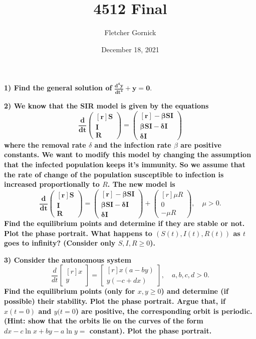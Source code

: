 \documentclass[11pt]{article}
\title{4512 Final}
\author{Fletcher Gornick}
\date{December 18, 2021}
\begin{document}
 \maketitle 
 \textbf{1) Find the general solution of } \(\mathbf{\displaystyle\frac{d^4 y}{dt^4} + y = 0.}\)
 \newpage

 \textbf{2) We know that the SIR model is given by the equations}
 \[\mathbf{\frac{d}{dt} \begin{pmatrix*}[r] S \\ I \\ R\end{pmatrix*}
   = \begin{pmatrix*}[r] -\beta S I \\ \beta S I - \delta I \\ \delta I\end{pmatrix*}}\]
 \textbf{where the removal rate \(\delta\) and the infection rate \(\beta\) are positive 
 constants. We want to modify this model by changing the assumption that the infected population 
 keeps it's immunity. So we assume that the rate of change of the population susceptible to 
 infection is increased proportionally to \(R\). The new model is}
 \[\mathbf{\frac{d}{dt} \begin{pmatrix*}[r] S \\ I \\ R\end{pmatrix*} = 
 \begin{pmatrix*}[r] -\beta S I \\ \beta S I - \delta I \\ \delta I\end{pmatrix*}} + 
 \begin{pmatrix*}[r] \mu R \\ 0 \\ -\mu R \end{pmatrix*}, \quad \mu > 0.\]
 \textbf{Find the equilibrium points and determine if they are stable or not. Plot the phase 
 portrait. What happens to \((S(t),I(t),R(t))\) as \(t\) goes to infinity? (Consider only 
 \(S,I,R \geq 0\)).}
 \newpage

 \textbf{3) Consider the autonomous system}
 \[\frac{d}{dt} \begin{bmatrix*}[r] x \\ y \end{bmatrix*} = 
   \begin{bmatrix*}[r] x(a-by) \\ y(-c+dx) \end{bmatrix*}, \quad a,b,c,d > 0.\]
 \textbf{Find the equilibrium points (only for \(x,y \geq 0\)) and determine (if possible)
 their stability. Plot the phase portrait. Argue that, if \(x(t=0)\) and \(y(t=0\)) are positive, 
 the corresponding orbit is periodic. (Hint: show that the orbits lie on the curves of the form 
 \(dx -c \ln x + by - a \ln y = \) constant). Plot the phase portrait.}
 \newpage 
\end{document}
